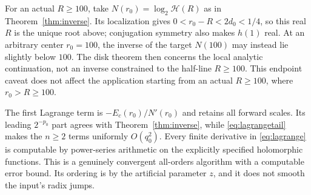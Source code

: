 For an actual $R\ge100$, take $N(r_0)=\log_2\mathcal H(R)$
as in Theorem~\ref{thm:inverse}. Its localization gives
$0<r_0-R<2d_0<1/4$, so this real $R$ is the unique root above;
conjugation symmetry also makes $h(1)$ real. At an arbitrary center
$r_0=100$, the inverse of the target $N(100)$ may instead lie
slightly below $100$. The disk theorem then concerns the local
analytic continuation, not an inverse constrained to the half-line
$R\ge100$. This endpoint caveat does not affect the application
starting from an actual $R\ge100$, where $r_0>R\ge100$.

The first Lagrange term is $-E_c(r_0)/N'(r_0)$ and retains all
forward scales. Its leading $2^{-p_0}$ part agrees with
Theorem~\ref{thm:inverse}, while \eqref{eq:lagrangetail} makes
the $n\ge2$ terms uniformly $O(q_0^2)$.
Every finite derivative in \eqref{eq:lagrange} is computable by
power-series arithmetic on the explicitly specified holomorphic
functions. This is a genuinely convergent all-orders algorithm with
a computable error bound. Its ordering is by the artificial parameter
$z$, and it does not smooth the input's radix jumps.

